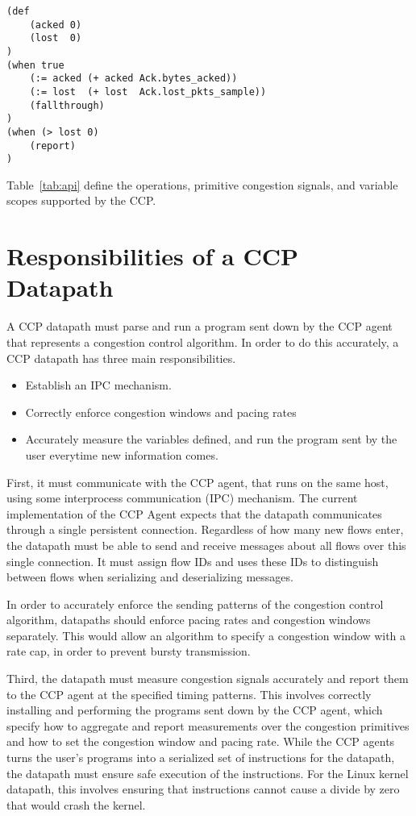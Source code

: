 \begin{verbatim}
(def
    (acked 0)
    (lost  0)
)
(when true
    (:= acked (+ acked Ack.bytes_acked))
    (:= lost  (+ lost  Ack.lost_pkts_sample))
    (fallthrough)
)
(when (> lost 0)
    (report)
)
\end{verbatim}

Table~\ref{tab:api} define the operations, primitive congestion signals, and variable scopes supported by the CCP.


\section{Responsibilities of a CCP Datapath}

A CCP datapath must parse and run a program sent down by the CCP agent that represents a congestion control algorithm.
In order to do this accurately, a CCP datapath has three main responsibilities.
  \begin{itemize}
    \item Establish an IPC mechanism.
    \item Correctly enforce congestion windows and pacing rates
    \item Accurately measure the variables defined, and run the program sent by the user everytime new information comes.
  \end{itemize}
First, it must communicate with the CCP agent, that runs on the same host, using some interprocess communication (IPC) mechanism.
The current implementation of the CCP Agent expects that the datapath communicates through a single persistent connection.
Regardless of how many new flows enter, the datapath must be able to send and receive messages about all flows over this single connection.
It must assign flow IDs and uses these IDs to distinguish between flows when serializing and deserializing messages.

In order to accurately enforce the sending patterns of the congestion control algorithm, datapaths should enforce pacing rates and congestion windows separately. This would allow an algorithm to specify a congestion window with a rate cap, in order to prevent bursty transmission.

Third, the datapath must measure congestion signals accurately and report them to the CCP agent at the specified timing patterns.
This involves correctly installing and performing the programs sent down by the CCP agent, which specify how to aggregate and report measurements over the congestion primitives and how to set the congestion window and pacing rate. While the CCP agents turns the user's programs into a serialized set of instructions for the datapath, the datapath must ensure safe execution of the instructions. For the Linux kernel datapath, this involves ensuring that instructions cannot cause a divide by zero that would crash the kernel.


